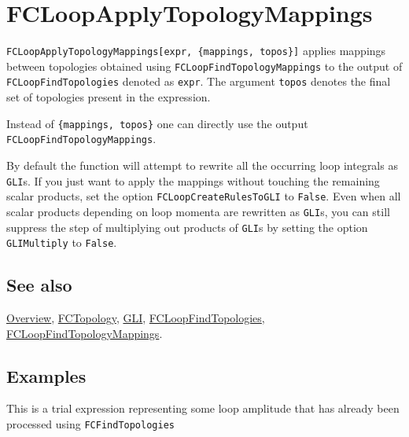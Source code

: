 \documentclass[../FeynCalcManual.tex]{subfiles}
\begin{document}
\hypertarget{fcloopapplytopologymappings}{
\section{FCLoopApplyTopologyMappings}\label{fcloopapplytopologymappings}}

\texttt{FCLoopApplyTopologyMappings[\allowbreak{}expr,\ \allowbreak{}\{\allowbreak{}mappings,\ \allowbreak{}topos\}]}
applies mappings between topologies obtained using
\texttt{FCLoopFindTopologyMappings} to the output of
\texttt{FCLoopFindTopologies} denoted as \texttt{expr}. The argument
\texttt{topos} denotes the final set of topologies present in the
expression.

Instead of \texttt{\{\allowbreak{}mappings,\ \allowbreak{}topos\}} one
can directly use the output \texttt{FCLoopFindTopologyMappings}.

By default the function will attempt to rewrite all the occurring loop
integrals as \texttt{GLI}s. If you just want to apply the mappings
without touching the remaining scalar products, set the option
\texttt{FCLoopCreateRulesToGLI} to \texttt{False}. Even when all scalar
products depending on loop momenta are rewritten as \texttt{GLI}s, you
can still suppress the step of multiplying out products of \texttt{GLI}s
by setting the option \texttt{GLIMultiply} to \texttt{False}.

\subsection{See also}

\hyperlink{toc}{Overview}, \hyperlink{fctopology}{FCTopology},
\hyperlink{gli}{GLI},
\hyperlink{fcloopfindtopologies}{FCLoopFindTopologies},
\hyperlink{fcloopfindtopologymappings}{FCLoopFindTopologyMappings}.

\subsection{Examples}

This is a trial expression representing some loop amplitude that has
already been processed using \texttt{FCFindTopologies}
\end{document}
